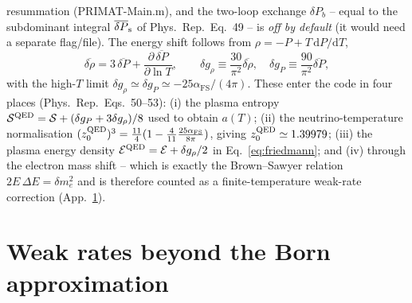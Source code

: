 \documentclass[11pt,a4paper]{article}
\newcommand{\dd}{\mathrm{d}}
\newcommand{\PR}{Phys.\ Rep.}
\newcommand{\afs}{\alpha_{\mathrm{FS}}}
\begin{document}
resummation (PRIMAT-Main.m), and the two-loop exchange $\delta P_b$ -- equal to
the subdominant integral $\overline{\delta P}_{\rm s}$ of \PR\ Eq.~49 -- is
\emph{off by default} (it would need a separate flag/file). The energy shift
follows from $\rho=-P+T\,\dd P/\dd T$,
\begin{equation}
  \overline{\delta\rho} = 3\,\overline{\delta P}
     + \frac{\partial\,\overline{\delta P}}{\partial\ln T},
  \qquad
  \delta g_\rho \equiv \frac{30}{\pi^2}\overline{\delta\rho},\quad
  \delta g_P \equiv \frac{90}{\pi^2}\overline{\delta P},
\end{equation}
with the high-$T$ limit $\delta g_\rho\simeq\delta g_P\simeq-25\afs/(4\pi)$. These
enter the code in four places (\PR\ Eqs.~50--53): (i) the plasma entropy
$\mathcal{S}^{\rm QED}=\mathcal{S}+(\delta g_P+3\delta g_\rho)/8$ used to obtain
$a(T)$; (ii) the neutrino-temperature normalisation
$(z_0^{\rm QED})^3=\tfrac{11}{4}(1-\tfrac{4}{11}\tfrac{25\afs}{8\pi})$, giving
$z_0^{\rm QED}\simeq1.39979$; (iii) the plasma energy density
$\mathcal{E}^{\rm QED}=\mathcal{E}+\delta g_\rho/2$ in
Eq.~\eqref{eq:friedmann}; and (iv) through the electron mass shift -- which is
exactly the Brown--Sawyer relation $2E\,\Delta E=\delta m_e^2$ and is therefore
counted as a finite-temperature weak-rate correction (App.~\ref{app:weak}).

\section{Weak rates beyond the Born approximation}\label{app:weak}
\end{document}
